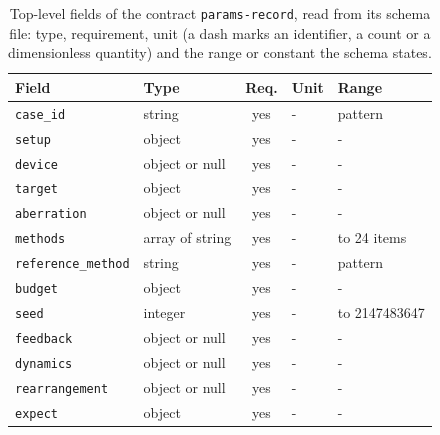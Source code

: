 \begin{table}[t]\centering\footnotesize
\caption{Top-level fields of the contract \texttt{params-record}, read from its schema file: type, requirement, unit (a dash marks an identifier, a count or a dimensionless quantity) and the range or constant the schema states.}\label{tab:contract-params-record}
\begin{tabular}{@{}l l c l >{\raggedright\arraybackslash}p{}@{}}\toprule Field & Type & Req. & Unit & Range\\\midrule
\texttt{\scriptsize case\_id} & string & yes & - & pattern\\
\texttt{\scriptsize setup} & object & yes & - & -\\
\texttt{\scriptsize device} & object or null & yes & - & -\\
\texttt{\scriptsize target} & object & yes & - & -\\
\texttt{\scriptsize aberration} & object or null & yes & - & -\\
\texttt{\scriptsize methods} & array of string & yes & - & 1 to 24 items\\
\texttt{\scriptsize reference\_method} & string & yes & - & pattern\\
\texttt{\scriptsize budget} & object & yes & - & -\\
\texttt{\scriptsize seed} & integer & yes & - & 0 to 2147483647\\
\texttt{\scriptsize feedback} & object or null & yes & - & -\\
\texttt{\scriptsize dynamics} & object or null & yes & - & -\\
\texttt{\scriptsize rearrangement} & object or null & yes & - & -\\
\texttt{\scriptsize expect} & object & yes & - & -\\
\bottomrule\end{tabular}\end{table}

